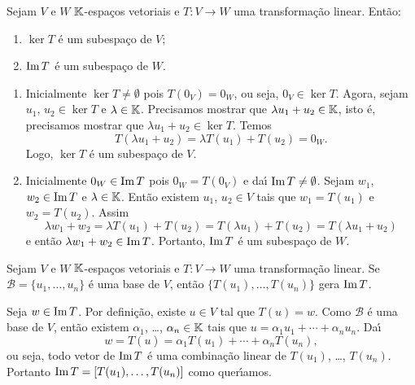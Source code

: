 \begin{proposicao}
  Sejam $V$ e $W$ $\mathbb{K}$-espa\c{c}os vetoriais e $T \colon V \to W$ uma transforma\c{c}\~ao linear. Ent\~ao:
  \begin{enumerate}[label={\roman*})]
    \item $\ker T$ \'e um subespa\c{c}o de $V$;
    \item ${\rm Im\,} T$ \'e um subespa\c{c}o de $W$.
  \end{enumerate}
\end{proposicao}
\begin{prova}
  \begin{enumerate}[label={\roman*})]
    \item Inicialmente $\ker T \ne \emptyset$ pois $T(0_V) = 0_W$, ou seja, $0_V \in \ker T$. Agora, sejam $u_1$, $u_2 \in \ker T$ e $\lambda \in \mathbb{K}$. Precisamos mostrar que $\lambda u_1 + u_2 \in \mathbb{K}$, isto \'e, precisamos mostrar que $\lambda u_1 + u_2 \in \ker T$. Temos
    \[
      T(\lambda u_1 + u_2) = \lambda T(u_1) + T(u_2) = 0_W.
    \]
    Logo, $\ker T$ \'e um subespa\c{c}o de $V$.

    \item Inicialmente $0_W \in {\rm Im\,} T$ pois $0_W = T(0_V)$ e da{\'\i} ${\rm Im\,} T \ne \emptyset$. Sejam $w_1$, $w_2 \in {\rm Im\,} T$ e $\lambda \in \mathbb{K}$. Ent\~ao existem $u_1$, $u_2 \in V$ tais que $w_1 = T(u_1)$ e $w_2 = T(u_2)$. Assim
    \[
      \lambda w_1 + w_2 = \lambda T(u_1) + T(u_2) = T(\lambda u_1) + T(u_2) = T(\lambda u_1 + u_2)
    \]
    e ent\~ao $\lambda w_1 + w_2 \in {\rm Im\,} T$. Portanto, ${\rm Im\,} T$ \'e um subespa\c{c}o de $W$.
  \end{enumerate}
\end{prova}

\begin{lema}\label{transformacao_gera_imagem}
  Sejam $V$ e $W$ $\mathbb{K}$-espa\c{c}os vetoriais e $T \colon V \to W$ uma transforma\c{c}\~ao linear. Se $\mathcal{B} = \{u_1, \dots, u_n\}$ \'e uma base de $V$, ent\~ao $\{T(u_1), \dots, T(u_n)\}$ gera ${\rm Im\,} T$.
\end{lema}
\begin{prova}
  Seja $w \in {\rm Im\,} T$. Por defini\c{c}\~ao, existe $u \in V$ tal que $T(u) = w$. Como $\mathcal{B}$ \'e uma base de $V$, ent\~ao existem $\alpha_1$, \dots, $\alpha_n \in \mathbb{K}$ tais que $u = \alpha_1u_1 + \cdots + \alpha_nu_n$. Da{\'\i}
  \[
    w = T(u) = \alpha_1T(u_1) + \cdots + \alpha_nT(u_n),
  \]
  ou seja, todo vetor de ${\rm Im\,} T$ \'e uma combina\c{c}\~ao linear de $T(u_1)$, \dots, $T(u_n)$. Portanto ${\rm Im\,} T = [T(u_1), \dots, T(u_n)]$ como quer{\'\i}amos.
\end{prova}

